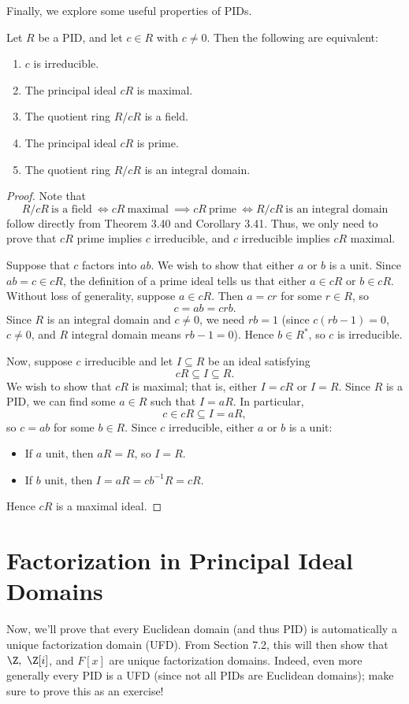 \documentclass[math1530-lecture-notes]{subfiles}
\begin{document}
Finally, we explore some useful properties of PIDs.
\begin{theorem}{}
  Let $R$ be a PID, and let $c\in R$ with $c\neq 0$. Then the following are equivalent:
  \begin{enumerate}
    \item $c$ is irreducible.
    \item The principal ideal $cR$ is maximal.
    \item The quotient ring $R/cR$ is a field.
    \item The principal ideal $cR$ is prime.
    \item The quotient ring $R / cR$ is an integral domain.
  \end{enumerate}
\end{theorem}
\begin{proof}[Proof]
  Note that \[
    R /cR~\text{is a field}~\iff cR~\text{maximal}~\implies cR~\text{prime}~\iff R / cR ~\text{is an
    integral domain}
  \] follow directly from Theorem 3.40 and Corollary 3.41. Thus, we only need to prove that $cR$
  prime implies $c$ irreducible, and $c$ irreducible implies $cR$ maximal.

  Suppose that $c$ factors into $ab$. We wish to show that either $a$ or $b$ is a unit. Since
  $ab=c\in cR$, the definition of a prime ideal tells us that either $a\in cR$ or $b\in cR$.
  Without loss of generality, suppose $a\in cR$. Then $a=cr$ for some $r\in R$, so \[
    c=ab=crb
  .\] Since $R$ is an integral domain and $c\neq 0$, we need $rb=1$ (since $c(rb-1)=0$, $c\neq 0$,
  and $R$ integral domain means $rb-1=0$). Hence $b\in R^*$, so $c$ is irreducible.

  Now, suppose $c$ irreducible and let $I\subseteq R$ be an ideal satisfying \[
    cR\subseteq I\subseteq R
  .\] We wish to show that $cR$ is maximal; that is, either $I=cR$ or $I=R$. Since $R$ is a PID, we
  can find some $a\in R$ such that $I=aR$. In particular, \[
    c\in cR\subseteq I=aR
  ,\] so $c=ab$ for some $b\in R$. Since $c$ irreducible, either $a$ or $b$ is a unit:
  \begin{itemize}
    \item If $a$ unit, then $aR=R$, so $I=R$.
    \item If $b$ unit, then $I=aR=c b^{-1}R=cR$.
  \end{itemize}
  Hence $cR$ is a maximal ideal.
\end{proof}

\section{Factorization in Principal Ideal Domains}
Now, we'll prove that every Euclidean domain (and thus PID) is automatically a unique factorization
domain (UFD). From Section 7.2, this will then show that $\Z,\ \Z[i]$, and $F[x]$ are unique
factorization domains. Indeed, even more generally every PID is a UFD (since not all PIDs are
Euclidean domains); make sure to prove this as an exercise!
\end{document}
